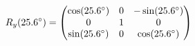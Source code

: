 \documentclass[preview]{standalone}
\begin{document}
\begin{align*}
\special{dvisvgm:raw <g id='unique000'>}R_y(25.6^\circ) = \begin{pmatrix} \cos(25.6^\circ) & 0 & -\sin(25.6^\circ) \\ 0 & 1 & 0 \\ \sin(25.6^\circ) & 0 & \cos(25.6^\circ) \end{pmatrix}\special{dvisvgm:raw </g>}
\end{align*}
\end{document}
